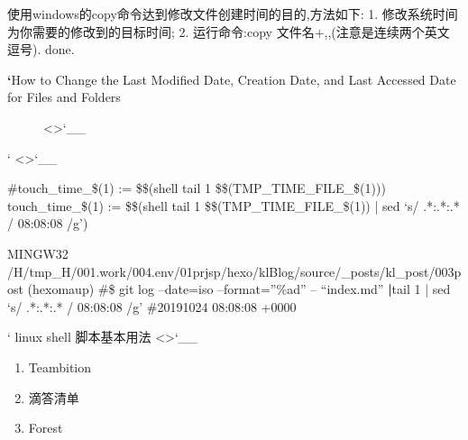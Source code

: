 \documentclass[letterpaper,12pt,english]{sphinxmanual}
\begin{document}
使用windows的copy命令达到修改文件创建时间的目的,方法如下:
1. 修改系统时间为你需要的修改到的目标时间;
2. 运行命令:copy 文件名+,,(注意是连续两个英文逗号).
done.
\begin{description}
\item[{{\color{red}\bfseries{}`}How to Change the Last Modified Date, Creation Date, and Last Accessed Date for Files and Folders}] \leavevmode
<>`\_\_

\end{description}



` <>`\_\_

\#touch\_time\_\$(1) := \$\$(shell tail \sphinxhyphen{}1 \$\$(TMP\_TIME\_FILE\_\$(1)))
touch\_time\_\$(1) := \$\$(shell tail \sphinxhyphen{}1 \$\$(TMP\_TIME\_FILE\_\$(1)) | sed ‘s/ .*:.*:.* / 08:08:08 /g’)

 MINGW32 /H/tmp\_H/001.work/004.env/01prjsp/hexo/klBlog/source/\_posts/kl\_post/003post (hexo\sphinxhyphen{}maup)
\#\$ git log –date=iso –format=”\%ad” – “index.md” {\color{red}\bfseries{}|}tail \sphinxhyphen{}1 | sed ‘s/ .*:.*:.* / 08:08:08 /g’
\#2019\sphinxhyphen{}10\sphinxhyphen{}24 08:08:08 +0000



`
linux shell 脚本基本用法 <>`\_\_


\begin{enumerate}
%
\item {} 
Teambition

\item {} 
滴答清单

\item {} 
Forest

\end{enumerate}
\end{document}
